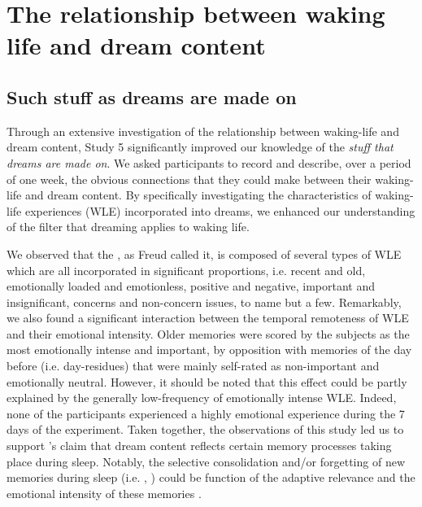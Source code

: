 \cleardoublepage
\chapter{The relationship between waking life and dream content}
\label{disc:wle}

\section{Such stuff as dreams are made on}
\label{disc:drf:summary:residue}


Through an extensive investigation of the relationship between waking-life and dream content, Study 5 significantly improved our knowledge of the \emph{stuff that dreams are made on}. We asked participants to record and describe, over a period of one week, the obvious connections that they could make between their waking-life and dream content. By specifically investigating the characteristics of waking-life experiences (WLE) incorporated into dreams, we enhanced our understanding of the filter that dreaming applies to waking life.

We observed that the , as Freud called it, is composed of several types of WLE which are all incorporated in significant proportions, i.e. recent and old, emotionally loaded and emotionless, positive and negative, important and insignificant, concerns and non-concern issues, to name but a few. Remarkably, we also found a significant interaction between the temporal remoteness of WLE and their emotional intensity. Older memories were scored by the subjects as the most emotionally intense and important, by opposition with memories of the day before (i.e. day-residues) that were mainly self-rated as non-important and emotionally neutral. However, it should be noted that this effect could be partly explained by the generally low-frequency of emotionally intense WLE. Indeed, none of the participants experienced a highly emotional experience during the 7 days of the experiment. Taken together, the observations of this study led us to support \citet{payne_sleep_2004}'s claim that dream content reflects certain memory processes taking place during sleep. Notably, the selective consolidation and/or forgetting of new memories during sleep (i.e. , \citealp{stickgold_sleep-dependent_2013}) could be function of the adaptive relevance and the emotional intensity of these memories \citep{schwartz_are_2003, malinowski_memory_2014, saletin_role_2011}.

